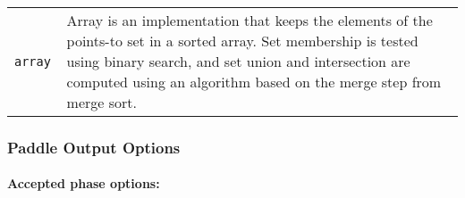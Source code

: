\documentclass{article}
\begin{document}
\begin{description}
\begin{longtable}{p{1in}p{4in}}
{\tt array }
&

Array is an implementation that keeps the elements of the
points-to set in a sorted array. Set membership is tested using
binary search, and set union and intersection are computed using
an algorithm based on the merge step from merge sort.
\\

\end{longtable}


\end{description}

\subsubsection{Paddle Output Options}


\paragraph{Accepted phase options:} 
\end{document}
